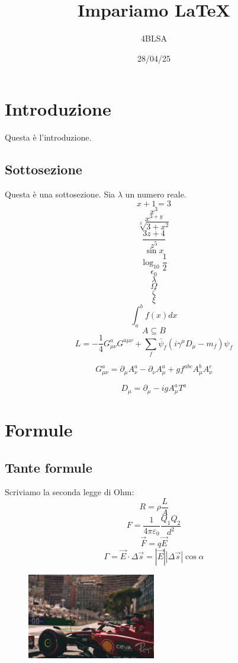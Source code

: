 \documentclass[10pt]{article}
\title{Impariamo \LaTeX}
\author{4BLSA}
\date{28/04/25}
\begin{document}
\maketitle
\tableofcontents
\newpage


\section{Introduzione}
Questa è l'introduzione. 
 





\subsection{Sottosezione}
Questa è una sottosezione. Sia $\lambda$ un numero reale.
$$x+1=3$$
$$x^3$$
$$x^{3+y}$$
$$\sqrt[3]{3+x^2}$$
$$\frac{3z+4}{z^5}$$
$$\sin x$$
$$\log_{10}{\frac{1}{2}}$$
$$\epsilon_0$$
$$\lambda$$
$$\Omega$$
$$\zeta$$
$$\xi$$
$$\int_{a}^{b} f(x)dx$$
$$A\subseteq B$$
$$
L = -\frac{1}{4} G_{\mu\nu}^a G^{a\mu\nu} + \sum_{f} \bar{\psi}_f \left( i\gamma^\mu D_\mu - m_f \right) \psi_f
$$

$$
G_{\mu\nu}^a = \partial_\mu A_\nu^a - \partial_\nu A_\mu^a + g f^{abc} A_\mu^b A_\nu^c
$$

$$
D_\mu = \partial_\mu - i g A_\mu^a T^a
$$

\newpage
\section{Formule}
\subsection{Tante formule}
Scriviamo la seconda legge di Ohm:
$$R=\rho \frac{L}{A}$$
$$F=\frac{1}{4\pi\varepsilon_0}\frac{Q_1Q_2}{d^2}$$
$$\vec{F}=q\vec{E}$$
$$\Gamma=\vec{E}\cdot \Delta\vec{s}=|\vec{E}||\Delta\vec{s}|\cos\alpha$$

\begin{figure}[h!]
    \includegraphics[width=0.5\textwidth]{pic.jpg}
\end{figure}
\end{document}
